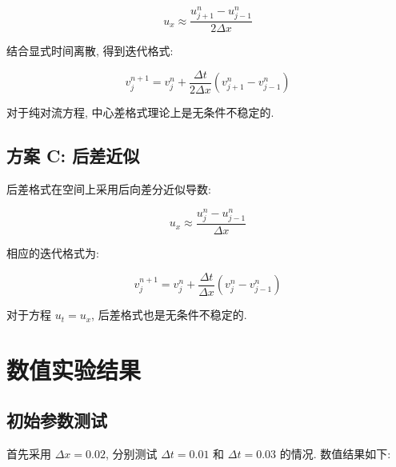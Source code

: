 \documentclass[12pt]{article}
\begin{document}
            \begin{equation*}
            u_x \approx \frac{u_{j+1}^n - u_{j-1}^n}{2\Delta x}
            \end{equation*}

            结合显式时间离散, 得到迭代格式:

            \begin{equation*}
            v_j^{n+1} = v_j^n + \frac{\Delta t}{2\Delta x}(v_{j+1}^n - v_{j-1}^n)
            \end{equation*}

            对于纯对流方程, 中心差格式理论上是无条件不稳定的.

        \subsection{方案 C: 后差近似}

            后差格式在空间上采用后向差分近似导数:

            \begin{equation*}
            u_x \approx \frac{u_j^n - u_{j-1}^n}{\Delta x}
            \end{equation*}

            相应的迭代格式为:

            \begin{equation*}
            v_j^{n+1} = v_j^n + \frac{\Delta t}{\Delta x}(v_j^n - v_{j-1}^n)
            \end{equation*}

            对于方程 $u_t = u_x$, 后差格式也是无条件不稳定的.

    \section{数值实验结果}
        \subsection{初始参数测试}
            首先采用 $\Delta x = 0.02$, 分别测试 $\Delta t = 0.01$ 和 $\Delta t = 0.03$ 的情况. 数值结果如下:
\end{document}

